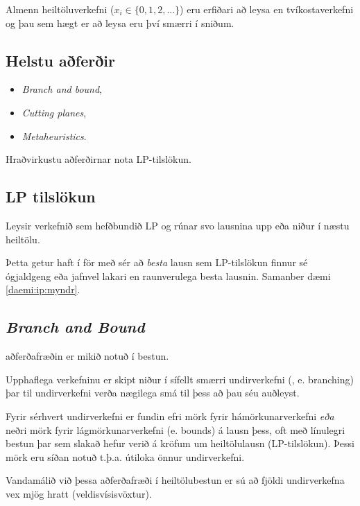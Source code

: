 Almenn heiltöluverkefni ($x_i\in\{0,1,2,...\}$) eru erfiðari að leysa en tvíkostaverkefni og þau sem hægt er að leysa eru því smærri í sniðum. 

\subsection*{Helstu aðferðir}
\begin{itemize}
\item \emph{Branch and bound},
\item \emph{Cutting planes},
\item \emph{Metaheuristics}.
\end{itemize}

Hraðvirkustu aðferðirnar nota LP-tilslökun.

\subsection{LP tilslökun}
Leysir verkefnið sem hefðbundið LP og rúnar svo lausnina upp eða niður í næstu heiltölu.

\begin{aths}Þetta getur haft í för með sér að \emph{besta} lausn sem LP-tilslökun finnur sé ógjaldgeng eða jafnvel lakari en raunverulega besta lausnin. Samanber dæmi \ref{daemi:ip:myndr}.
\end{aths}

\subsection{\emph{Branch and Bound}}
 aðferðafræðin er mikið notuð í bestun. 

Upphaflega verkefninu er skipt niður í sífellt smærri undirverkefni (, e. branching) þar til undirverkefni verða nægilega smá til þess að þau séu auðleyst.

Fyrir sérhvert undirverkefni er fundin efri mörk fyrir hámörkunarverkefni \emph{eða} neðri mörk fyrir lágmörkunarverkefni (e. bounds) á lausn þess, oft með línulegri bestun þar sem slakað hefur verið á kröfum um heiltölulausn (LP-tilslökun). Þessi mörk eru síðan notuð t.þ.a. útiloka önnur undirverkefni.

Vandamálið við þessa aðferðafræði í heiltölubestun er sú að fjöldi undirverkefna vex  mjög hratt (veldisvísisvöxtur).


